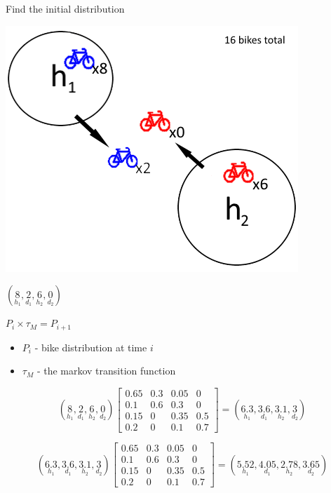 \begin{frame}{Find the initial distribution}
\begin{center}

\includegraphics[scale=0.7]{graphics/initialworld2}
	
$(
\underset{h_1}{8},
\underset{d_1}{2},
\underset{h_2}{6},
\underset{d_2}{0}
)$
\end{center}
\end{frame}

\begin{frame}[fragile]
	

	
\begin{center}	
	
$ P_i \times \tau_M = P_{i+1}$\\

\begin{itemize}
	\item \textbf{$ P_i $} - bike distribution at time $ i $
	\item \textbf{$ \tau_M $} - the markov transition function 
\end{itemize}
		
		

\[
(\underset{h_1}{8},
\underset{d_1}{2},
\underset{h_2}{6},
\underset{d_2}{0})	
\begin{bmatrix}
0.65 & 0.3 & 0.05 & 0\\
0.1  & 0.6 & 0.3  & 0\\
0.15 & 0   & 0.35 & 0.5\\
0.2  & 0   & 0.1  & 0.7
\end{bmatrix}
=
(
\underset{h_1}{6.3},
\underset{d_1}{3.6},
\underset{h_2}{3.1},
\underset{d_2}{3}
)
\]

\[
(
\underset{h_1}{6.3},
\underset{d_1}{3.6},
\underset{h_2}{3.1},
\underset{d_2}{3}
)
\begin{bmatrix}
0.65 & 0.3 & 0.05 & 0\\
0.1  & 0.6 & 0.3  & 0\\
0.15 & 0   & 0.35 & 0.5\\
0.2  & 0   & 0.1  & 0.7
\end{bmatrix}
=
(
\underset{h_1}{5.52},
\underset{d_1}{4.05},
\underset{h_2}{2.78},
\underset{d_2}{3.65}
)
\]


\end{center}
\end{frame}

